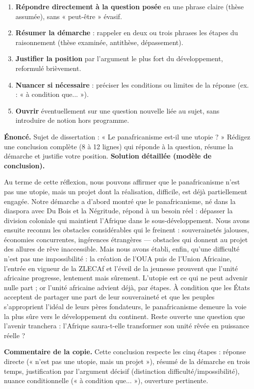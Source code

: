 \documentclass[11pt]{article}
\newcommand{\cle}[1]{{\popxbold\color{popdark}#1}}
\begin{document}
\begin{methode}
\begin{enumerate}
\item \textbf{Répondre directement à la question posée} en une phrase claire (thèse assumée), sans « peut-être » évasif.
\item \textbf{Résumer la démarche} : rappeler en deux ou trois phrases les étapes du raisonnement (thèse examinée, antithèse, dépassement).
\item \textbf{Justifier la position} par l'argument le plus fort du développement, reformulé brièvement.
\item \textbf{Nuancer si nécessaire} : préciser les conditions ou limites de la réponse (ex. : « à condition que... »).
\item \textbf{Ouvrir} éventuellement sur une question nouvelle liée au sujet, sans introduire de notion hors programme.
\end{enumerate}
\end{methode}

\begin{exoresolu}
\textbf{Énoncé.} Sujet de dissertation : « Le panafricanisme est-il une utopie ? » Rédigez une conclusion complète (8 à 12 lignes) qui réponde à la question, résume la démarche et justifie votre position.
\tcblower
\textbf{Solution détaillée (modèle de conclusion).}

Au terme de cette réflexion, nous pouvons affirmer que le panafricanisme n'est pas une utopie, mais un \cle{projet} dont la réalisation, difficile, est déjà partiellement engagée. Notre démarche a d'abord montré que le panafricanisme, né dans la diaspora avec Du Bois et la Négritude, répond à un besoin réel : dépasser la division coloniale qui maintient l'Afrique dans le sous-développement. Nous avons ensuite reconnu les obstacles considérables qui le freinent : souverainetés jalouses, économies concurrentes, ingérences étrangères — obstacles qui donnent au projet des allures de rêve inaccessible. Mais nous avons établi, enfin, qu'une difficulté n'est pas une impossibilité : la création de l'OUA puis de l'Union Africaine, l'entrée en vigueur de la ZLECAf et l'éveil de la jeunesse prouvent que l'unité africaine progresse, lentement mais sûrement. L'utopie est ce qui ne peut advenir nulle part ; or l'unité africaine advient déjà, par étapes. À condition que les États acceptent de partager une part de leur souveraineté et que les peuples s'approprient l'idéal de leurs pères fondateurs, le panafricanisme demeure la voie la plus sûre vers le développement du continent. Reste ouverte une question que l'avenir tranchera : l'Afrique saura-t-elle transformer son unité rêvée en puissance réelle ?

\textbf{Commentaire de la copie.} Cette conclusion respecte les cinq étapes : réponse directe (« n'est pas une utopie, mais un projet »), résumé de la démarche en trois temps, justification par l'argument décisif (distinction difficulté/impossibilité), nuance conditionnelle (« à condition que... »), ouverture pertinente.
\end{exoresolu}
\end{document}
